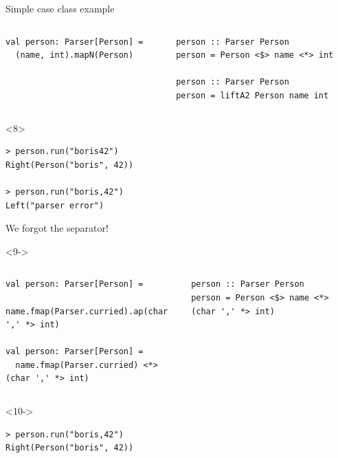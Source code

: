 \documentclass[presentation,aspectratio=169,smaller]{beamer}
\begin{document}
\begin{frame}[label={sec:org5448bc0},fragile,t]{Simple case class example}
\begin{onlyenv}
\begin{columns}
\begin{column}[t]{0.5\columnwidth}
\begin{verbatim}
val person: Parser[Person] =
  (name, int).mapN(Person)
\end{verbatim}
\end{column}

\begin{column}[t]{0.5\columnwidth}
\begin{verbatim}
person :: Parser Person
person = Person <$> name <*> int

person :: Parser Person
person = liftA2 Person name int
\end{verbatim}
\end{column}
\end{columns}
\end{onlyenv}

\begin{onlyenv}<8>
\begin{verbatim}
> person.run("boris42")
Right(Person("boris", 42))

> person.run("boris,42")
Left("parser error")
\end{verbatim}

We forgot the separator!
\end{onlyenv}

\begin{onlyenv}<9->
\begin{columns}
\begin{column}[t]{0.5\columnwidth}
\begin{verbatim}
val person: Parser[Person] =
  name.fmap(Parser.curried).ap(char ',' *> int)

val person: Parser[Person] =
  name.fmap(Parser.curried) <*> (char ',' *> int)
\end{verbatim}
\end{column}

\begin{column}[t]{0.5\columnwidth}
\begin{verbatim}
person :: Parser Person
person = Person <$> name <*> (char ',' *> int)
\end{verbatim}
\end{column}
\end{columns}
\end{onlyenv}

\begin{onlyenv}<10->
\begin{verbatim}
> person.run("boris,42")
Right(Person("boris", 42))
\end{verbatim}
\end{onlyenv}
\end{frame}
\end{document}
